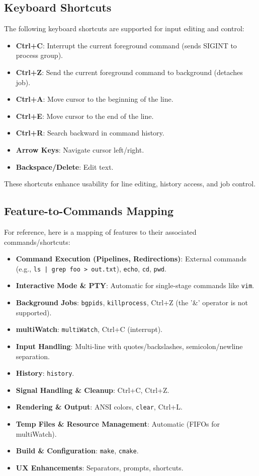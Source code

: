 \documentclass[11pt,a4paper]{article}
\begin{document}
\subsection{Keyboard Shortcuts}
The following keyboard shortcuts are supported for input editing and control:

\begin{itemize}[leftmargin=*]
  \item \textbf{Ctrl+C}: Interrupt the current foreground command (sends SIGINT to process group).
  \item \textbf{Ctrl+Z}: Send the current foreground command to background (detaches job).
  \item \textbf{Ctrl+A}: Move cursor to the beginning of the line.
  \item \textbf{Ctrl+E}: Move cursor to the end of the line.
  \item \textbf{Ctrl+R}: Search backward in command history.
  \item \textbf{Arrow Keys}: Navigate cursor left/right.
  \item \textbf{Backspace/Delete}: Edit text.
\end{itemize}
These shortcuts enhance usability for line editing, history access, and job control.

\subsection{Feature-to-Commands Mapping}
For reference, here is a mapping of features to their associated commands/shortcuts:

\begin{itemize}[leftmargin=*]
  \item \textbf{Command Execution (Pipelines, Redirections)}: External commands (e.g., \texttt{ls | grep foo > out.txt}), \texttt{echo}, \texttt{cd}, \texttt{pwd}.
  \item \textbf{Interactive Mode \& PTY}: Automatic for single-stage commands like \texttt{vim}.
  \item \textbf{Background Jobs}: \texttt{bgpids}, \texttt{killprocess}, Ctrl+Z (the '&' operator is not supported).
  \item \textbf{multiWatch}: \texttt{multiWatch}, Ctrl+C (interrupt).
  \item \textbf{Input Handling}: Multi-line with quotes/backslashes, semicolon/newline separation.
  \item \textbf{History}: \texttt{history}.
  \item \textbf{Signal Handling \& Cleanup}: Ctrl+C, Ctrl+Z.
  \item \textbf{Rendering \& Output}: ANSI colors, \texttt{clear}, Ctrl+L.
  \item \textbf{Temp Files \& Resource Management}: Automatic (FIFOs for multiWatch).
  \item \textbf{Build \& Configuration}: \texttt{make}, \texttt{cmake}.
  \item \textbf{UX Enhancements}: Separators, prompts, shortcuts.
\end{itemize}
\end{document}

